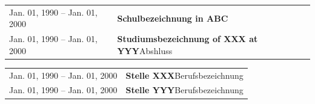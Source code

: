 \begingroup%
\small%
\setlength{\tabcolsep}{0pt}%
\renewcommand{\arraystretch}{1.3}%
\begin{longtable}{>{\raggedright\arraybackslash}p{}>{\raggedright\arraybackslash}p{}}%
Jan. 01, 1990 -- Jan. 01, 2000 & \textbf{Schulbezeichnung in ABC}\\
Jan. 01, 1990 -- Jan. 01, 2000 & \textbf{Studiumsbezeichnung of XXX at YYY}\newline Abshluss\\
\end{longtable}
\endgroup%

\begingroup%
\small%
\setlength{\tabcolsep}{0pt}%
\renewcommand{\arraystretch}{1.3}%
\begin{longtable}{>{\raggedright\arraybackslash}p{}>{\raggedright\arraybackslash}p{}}%
Jan. 01, 1990 -- Jan. 01, 2000 & \textbf{Stelle XXX}\newline Berufsbezeichnung\\
Jan. 01, 1990 -- Jan. 01, 2000 & \textbf{Stelle YYY}\newline Berufsbezeichnung\\
\end{longtable}
\endgroup%
